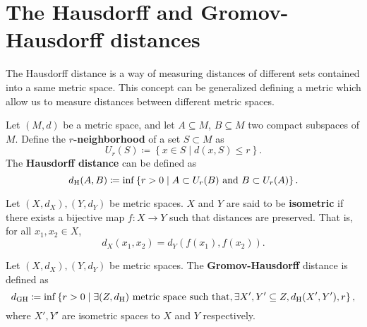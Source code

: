 \begin{definition}

\end{definition}

\begin{definition}
     
\end{definition}

\begin{definition} \label{delta-matching}
    
\end{definition}

\begin{definition}
    
\end{definition}


\section{The Hausdorff and Gromov-Hausdorff distances}

The Hausdorff distance is a way of measuring distances of different sets contained into a same metric space. This concept can be generalized defining a metric which allow us to measure distances between different metric spaces.

\begin{definition}
    Let $ (M, d) $ be a metric space, and let $ A \subseteq M $, $ B \subseteq M $ two compact subspaces of $ M $. Define the {\bf $r$-neighborhood} of a set $ S \subset M $ as
    $$
        U_r(S) \coloneq \left\{ x \in S \mid d(x, S) \leq r \right\}.
    $$
    The {\bf Hausdorff distance} can be defined as
    $$
        d_{\operatorname{H}}(A, B) \coloneq \inf \left\{ r > 0 \mid A \subset U_r(B) \text{ and } B \subset U_r(A) \right\}.
    $$
\end{definition}

\begin{definition}
    Let $ (X, d_X), (Y, d_Y) $ be metric spaces. $ X $ and $ Y $ are said to be {\bf isometric} if there exists a bijective map $ f: X \to Y $ such that distances are preserved. That is, for all $ x_1, x_2 \in X $,
    $$
        d_X(x_1, x_2) = d_Y(f(x_1), f(x_2)).
    $$
\end{definition}

\begin{definition}
    Let $ (X, d_X), (Y, d_Y) $ be metric spaces. The {\bf Gromov-Hausdorff} distance is defined as
    $$
        d_{\operatorname{GH}} \coloneq \inf \left\{ r > 0 \mid \exists (Z, d_{\operatorname{H}}) \text{ metric space such that}, \exists X', Y' \subseteq Z, d_{\operatorname{H}}(X', Y') , r \right\},
    $$
    where $ X', Y' $ are isometric spaces to $ X $ and $ Y $ respectively.
\end{definition}

